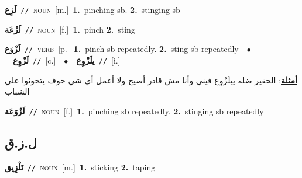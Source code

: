 \documentclass[10pt,a4paper,twoside]{article} %
\begin{document}
\begin{multicols}{2}
{\setlength\topsep{0pt}\textbf{\foreignlanguage{arabic}{لَزِع}}\ {\color{gray}\texttt{//}\color{black}}\ \textsc{noun}\ [m.]\ \textbf{1.}~pinching sb.  \textbf{2.}~stinging sb\ } \vspace{2mm}

{\setlength\topsep{0pt}\textbf{\foreignlanguage{arabic}{لَزْعَة}}\ {\color{gray}\texttt{//}\color{black}}\ \textsc{noun}\ [f.]\ \textbf{1.}~pinch  \textbf{2.}~sting\ } \vspace{2mm}

{\setlength\topsep{0pt}\textbf{\foreignlanguage{arabic}{لَزْوَع}}\ {\color{gray}\texttt{//}\color{black}}\ \textsc{verb}\ [p.]\ \textbf{1.}~pinch sb repeatedly.  \textbf{2.}~sting sb repeatedly\ \ $\bullet$\ \ \setlength\topsep{0pt}\textbf{\foreignlanguage{arabic}{لَزْوِع}}\ {\color{gray}\texttt{//}\color{black}}\ [c.]\ \ $\bullet$\ \ \setlength\topsep{0pt}\textbf{\foreignlanguage{arabic}{يلَزْوِع}}\ {\color{gray}\texttt{//}\color{black}}\ [i.]\  \begin{flushright}\color{gray}\foreignlanguage{arabic}{\textbf{\underline{\foreignlanguage{arabic}{أمثلة}}}: الحقير ضله ييلَزْوِع فيني وأنا مش قادر أصيح ولا أعمل أي شي خوف يتخوثوا علي الشباب}\end{flushright}\color{black}} \vspace{2mm}

{\setlength\topsep{0pt}\textbf{\foreignlanguage{arabic}{لَزْوَعَة}}\ {\color{gray}\texttt{//}\color{black}}\ \textsc{noun}\ [f.]\ \textbf{1.}~pinching sb repeatedly.  \textbf{2.}~stinging sb repeatedly\ } \vspace{2mm}

\vspace{-3mm}
\subsection*{\color{blue}\foreignlanguage{arabic}{ل.ز.ق}\color{blue}{}} 

{\setlength\topsep{0pt}\textbf{\foreignlanguage{arabic}{تَلْزِيق}}\ {\color{gray}\texttt{//}\color{black}}\ \textsc{noun}\ [m.]\ \textbf{1.}~sticking  \textbf{2.}~taping\ } \vspace{2mm}


\end{multicols}
\end{document}
